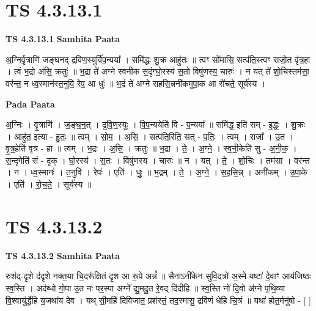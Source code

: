 \documentclass[17pt]{extarticle}
\begin{document}
\section{ TS 4.3.13.1 }

\textbf{TS 4.3.13.1 } \newline
\textbf{Samhita Paata} \newline

अ॒ग्निर्वृ॒त्राणि॑ जङ्घनद् द्रविण॒स्युर्वि॑प॒न्यया᳚ । समि॑द्धः शु॒क्र आहु॑तः ॥ त्वꣳ सो॑मासि॒ सत्प॑ति॒स्त्वꣳ राजो॒त वृ॑त्र॒हा । त्वं भ॒द्रो अ॑सि॒ क्रतुः॑ ॥ भ॒द्रा ते॑ अग्ने स्वनीक स॒दृंग्घो॒रस्य॑ स॒तो विषु॑णस्य॒ चारुः॑ । न यत् ते॑ शो॒चिस्तम॑सा॒ वर॑न्त॒ न ध्व॒स्मान॑स्त॒नुवि॒ रेप॒ आ धुः॑ ॥ भ॒द्रं ते॑ अग्ने सहसि॒न्ननी॑कमुपा॒क आ रो॑चते॒ सूर्य॑स्य । \newline

\textbf{Pada Paata} \newline

अ॒ग्निः । वृ॒त्राणि॑ । ज॒ङ्घ॒न॒त् । द्र॒वि॒ण॒स्युः । वि॒प॒न्ययेति॑ वि - प॒न्यया᳚ ॥ समि॑द्ध॒ इति॑ सम् - इ॒द्धः॒ । शु॒क्रः । आहु॑त॒ इत्या - हु॒तः॒ ॥ त्वम् । सो॒म॒ । अ॒सि॒ । सत्प॑ति॒रिति॒ सत् - प॒तिः॒ । त्वम् । राजा᳚ । उ॒त । वृ॒त्र॒हेति॑ वृत्र - हा ॥ त्वम् । भ॒द्रः । अ॒सि॒ । क्रतुः॑ ॥ भ॒द्रा । ते॒ । अ॒ग्ने॒ । स्व॒नी॒केति॑ सु - अ॒नी॒क॒ । स॒न्दृगेति॑ सं - दृक् । घो॒रस्य॑ । स॒तः । विषु॑णस्य । चारुः॑ ॥ न । यत् । ते॒ । शो॒चिः । तम॑सा । वर॑न्त । न । ध्व॒स्मानः॑ । त॒नुवि॑ । रेपः॑ । एति॑ । धुः॒ ॥ भ॒द्रम् । ते॒ । अ॒ग्ने॒ । स॒ह॒सि॒न्न् । अनी॑कम् । उ॒पा॒के । एति॑ । रो॒च॒ते॒ । सूर्य॑स्य ॥  \newline





\section{ TS 4.3.13.2 }

\textbf{TS 4.3.13.2 } \newline
\textbf{Samhita Paata} \newline

रुश॑द्-दृ॒शे द॑दृशे नक्त॒या चि॒दरू᳚क्षितं दृ॒श आ रू॒पे अन्नं᳚ ॥ सैनाऽनी॑केन सुवि॒दत्रो॑ अ॒स्मे यष्टा॑ दे॒वाꣳ आय॑जिष्ठः स्व॒स्ति । अद॑ब्धो गो॒पा उ॒त नः॑ पर॒स्पा अग्ने᳚ द्यु॒मदु॒त रे॒वद् दि॑दीहि ॥ स्व॒स्ति नो॑ दि॒वो अ॑ग्ने पृथि॒व्या वि॒श्वायु॑र्द्धेहि य॒जथा॑य देव । यथ् सी॒महि॑ दिविजात॒ प्रश॑स्तं॒ तद॒स्मासु॒ द्रवि॑णं धेहि चि॒त्रं ॥ यथा॑ होत॒र्मनु॑षो - [  ] \newline
\end{document}
